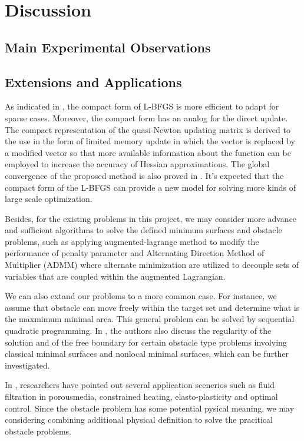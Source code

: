 \section{Discussion}
\subsection{Main Experimental Observations}
\subsection{Extensions and Applications}
As indicated in \cite{yueting2007compact}, the compact form of L-BFGS is more efficient to adapt for sparse cases. Moreover, the compact form has an analog for the direct update. The compact representation of the quasi-Newton updating matrix is derived to the use in the form of limited memory update in which the vector is replaced by a modified vector so that more available information about the function can be employed to increase the accuracy of Hessian approximations. The global convergence of the proposed method is also proved in \cite{yueting2007compact}. It’s expected that the compact form of the L-BFGS can provide a new model for solving more kinds of large scale optimization. 

Besides, for the existing problems in this project, we may consider more advance and sufficient algorithms to solve the defined minimum surfaces and obstacle problems, such as applying augmented-lagrange method to modify the performance of penalty parameter and Alternating Direction Method of Multiplier (ADMM) where alternate minimization are utilized to decouple sets of variables that are coupled within the augmented Lagrangian.

We can also extand our problems to a more common case. For instance, we assume that obstacle can move freely within the target set and determine what is the maxmimum minimal area. This general problem can be solved by 
sequential quadratic programming. In \cite{caffarelli2016obstacle}, the authors also discuss the regularity of the solution and of the free boundary for certain obstacle type problems involving classical minimal surfaces and nonlocal minimal surfaces, which can be further investigated.

In \cite{attouch2014variational}, researchers have pointed out several application scenerios such as fluid filtration in porousmedia, constrained heating, elasto-plasticity and optimal control. Since the obstacle problem has some potential pysical meaning, we may considering combining additional physical definition to solve the pracitical obstacle problems.